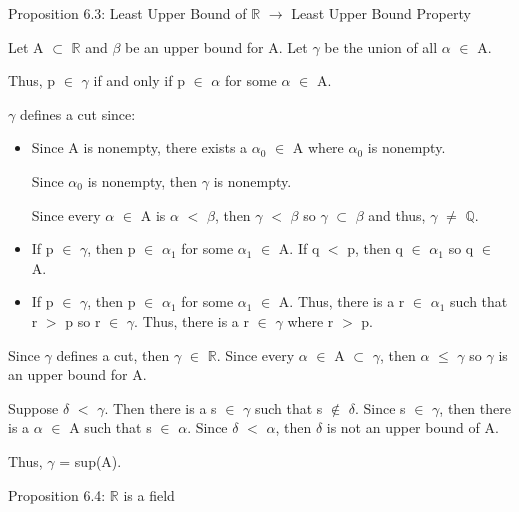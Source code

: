 { \color{blue} Proposition 6.3: Least Upper Bound of $\mathbb{R}$
$\rightarrow$ Least Upper Bound Property } 

	\begin{adjustbox}{minipage=14cm, right, vspace=0.1cm 0cm}
		Let A $\subset$ $\mathbb{R}$ and $\beta$ be an upper bound for A.
		Let $\gamma$ be the union of all $\alpha$ $\in$ A.

		Thus, p $\in$ $\gamma$ if and only if p $\in$ $\alpha$ for some $\alpha$ $\in$ A.

		$\gamma$ defines a cut since:

		\begin{itemize}[leftmargin=1cm, itemsep=0.4em]
			\item Since A is nonempty, there exists a $\alpha_0$ $\in$ A where $\alpha_0$ is nonempty.

				Since $\alpha_0$ is nonempty, then $\gamma$ is nonempty.

				Since every $\alpha$ $\in$ A is $\alpha$ $<$ $\beta$, then $\gamma$ $<$ $\beta$
				so $\gamma$ $\subset$ $\beta$ and thus, $\gamma$ $\neq$ $\mathbb{Q}$.

			\item If p $\in$ $\gamma$, then p $\in$ $\alpha_1$ for some $\alpha_1$ $\in$ A.
				If q $<$ p, then q $\in$ $\alpha_1$ so q $\in$ A.

			\item If p $\in$ $\gamma$, then p $\in$ $\alpha_1$ for some $\alpha_1$ $\in$ A.
				Thus, there is a r $\in$ $\alpha_1$ such that r $>$ p so r $\in$ $\gamma$.
				Thus, there is a r $\in$ $\gamma$ where r $>$ p.
		\end{itemize}

		Since $\gamma$ defines a cut, then $\gamma$ $\in$ $\mathbb{R}$.
		Since every $\alpha$ $\in$ A $\subset$ $\gamma$, then $\alpha$ $\leq$ $\gamma$
		so $\gamma$ is an upper bound for A.

		Suppose $\delta$ $<$ $\gamma$. Then there is a s $\in$ $\gamma$
		such that s $\not \in$ $\delta$.
		Since s $\in$ $\gamma$, then there is a $\alpha$ $\in$ A such that s $\in$ $\alpha$.
		Since $\delta$ $<$ $\alpha$, then $\delta$ is not an upper bound of A.

		Thus, $\gamma$ = sup(A).
	\end{adjustbox}

\newpage

{ \color{blue} Proposition 6.4: $\mathbb{R}$ is a field} 

